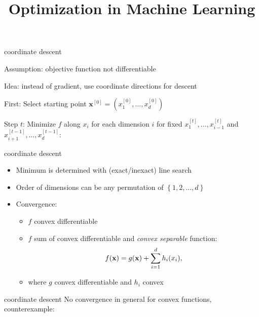 \documentclass[11pt,compress,t,notes=noshow, xcolor=table]{beamer}
\title{Optimization in Machine Learning}
\begin{document}

\begin{framei}{coordinate descent}
\item Assumption: objective function not differentiable
\item Idea: instead of gradient, use coordinate directions for descent
\item First: Select starting point $\bm{x}^{[0]} = (x^{[0]}_1, \ldots, x^{[0]}_d)$
\item Step $t$: Minimize $f$ along $x_i$ for each dimension $i$ for fixed $x^{[t]}_1, \ldots,x^{[t]}_{i-1}$ and $x^{[t-1]}_{i+1}, \ldots,x^{[t-1]}_d$:
\end{framei}

\begin{frame2}{coordinate descent}
\begin{itemize}
\item Minimum is determined with (exact/inexact) line search
\item Order of dimensions can be any permutation of $\left\{1,2,\ldots,d\right\}$
\item Convergence:
\begin{itemize}
\item $f$ convex differentiable
\item $f$ sum of convex differentiable and \textit{convex separable} function:
\begin{equation*}
f(\mathbf{x}) = g(\mathbf{x}) + \sum_{i=1}^d h_i(x_i),
\end{equation*}
\item where $g$ convex differentiable and $h_i$ convex
\end{itemize}
\end{itemize}
\end{frame2}

\begin{frame2}{coordinate descent}
No convergence in general for convex functions, counterexample:
\end{frame2}
\end{document}
